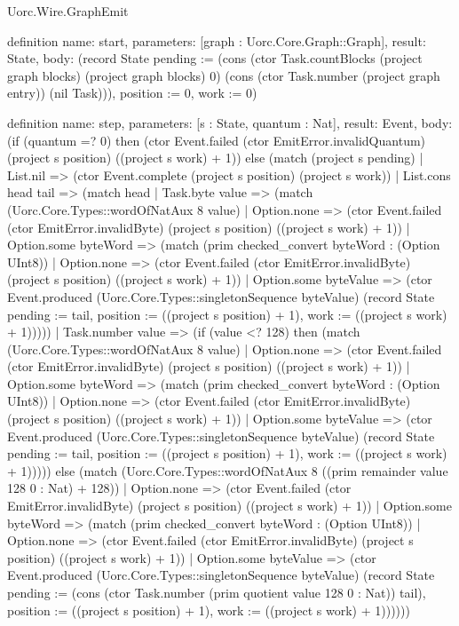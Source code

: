 \begin{lexlean}{Uorc.Wire.GraphEmit}
\begin{semanticmodule}
definition{
  name: start,
  parameters: [graph : Uorc.Core.Graph::Graph],
  result: State,
  body: (record State {pending := (cons (ctor Task.countBlocks (project graph blocks) (project graph blocks) 0) (cons (ctor Task.number (project graph entry)) (nil Task))), position := 0, work := 0})
}

definition{
  name: step,
  parameters: [s : State, quantum : Nat],
  result: Event,
  body: (if (quantum =? 0) then (ctor Event.failed (ctor EmitError.invalidQuantum) (project s position) ((project s work) + 1)) else (match (project s pending)
    | List.nil => (ctor Event.complete (project s position) (project s work))
    | List.cons head tail => (match head
      | Task.byte value => (match (Uorc.Core.Types::wordOfNatAux 8 value)
        | Option.none => (ctor Event.failed (ctor EmitError.invalidByte) (project s position) ((project s work) + 1))
        | Option.some byteWord => (match (prim checked_convert byteWord : (Option UInt8))
          | Option.none => (ctor Event.failed (ctor EmitError.invalidByte) (project s position) ((project s work) + 1))
          | Option.some byteValue => (ctor Event.produced (Uorc.Core.Types::singletonSequence byteValue) (record State {pending := tail, position := ((project s position) + 1), work := ((project s work) + 1)}))))
      | Task.number value => (if (value <? 128) then (match (Uorc.Core.Types::wordOfNatAux 8 value)
        | Option.none => (ctor Event.failed (ctor EmitError.invalidByte) (project s position) ((project s work) + 1))
        | Option.some byteWord => (match (prim checked_convert byteWord : (Option UInt8))
          | Option.none => (ctor Event.failed (ctor EmitError.invalidByte) (project s position) ((project s work) + 1))
          | Option.some byteValue => (ctor Event.produced (Uorc.Core.Types::singletonSequence byteValue) (record State {pending := tail, position := ((project s position) + 1), work := ((project s work) + 1)})))) else (match (Uorc.Core.Types::wordOfNatAux 8 ((prim remainder value 128 0 : Nat) + 128))
        | Option.none => (ctor Event.failed (ctor EmitError.invalidByte) (project s position) ((project s work) + 1))
        | Option.some byteWord => (match (prim checked_convert byteWord : (Option UInt8))
          | Option.none => (ctor Event.failed (ctor EmitError.invalidByte) (project s position) ((project s work) + 1))
          | Option.some byteValue => (ctor Event.produced (Uorc.Core.Types::singletonSequence byteValue) (record State {pending := (cons (ctor Task.number (prim quotient value 128 0 : Nat)) tail), position := ((project s position) + 1), work := ((project s work) + 1)})))))
}
\end{semanticmodule}
\end{lexlean}
